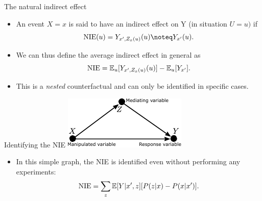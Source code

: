 \begin{frame}{The natural indirect effect}
    \begin{itemize}
        \item An event $X = x$ is said to have an indirect effect on Y (in situation $U = u)$ if
        \begin{equation*}
            \mathrm{NIE}(u) = Y_{x', Z_x(u)}(u) \noteq Y_{x'}(u).
        \end{equation*}
        \item We can thus define the average indirect effect in general as
        \begin{equation*}
            \mathrm{NIE} = \operatorname{\mathbb{E}}_u[Y_{x', Z_x(u)}(u)] - \operatorname{\mathbb{E}}_u[Y_{x'}].
        \end{equation*}
        \item This is a \emph{nested} counterfactual and can only be identified in specific cases.
    \end{itemize}
\end{frame}


\begin{frame}{Identifying the NIE}
    \centering
    \includegraphics[width=0.5\linewidth]{causal_figures/medanal1}%
    \begin{itemize}
        \item In this simple graph, the NIE is identified even without performing any experiments:
        \begin{equation*}
            \mathrm{NIE} = \sum_z\operatorname{\mathbb{E}}[Y | x', z][P(z|x) - P(x | x')].
        \end{equation*}
    \end{itemize}
\end{frame}


